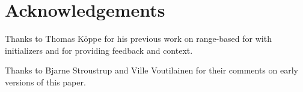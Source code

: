 \section*{Acknowledgements}

Thanks to Thomas Köppe for his previous work on range-based for with
initializers and for providing feedback and context.

Thanks to Bjarne Stroustrup and Ville Voutilainen for their comments on early
versions of this paper.
